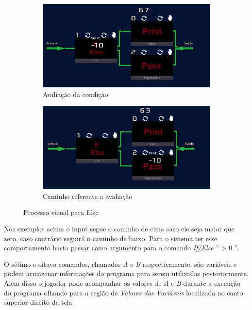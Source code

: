 \begin{figure}[H]
    \centering
    \begin{subfigure}{0.48\textwidth}
        \centering
        \includegraphics[width=1\textwidth]{../figuras/avaliacao_else.png}
        \caption{Avaliação da condição}
    \end{subfigure}
    \begin{subfigure}{0.48\textwidth}
        \centering
        \includegraphics[width=1\textwidth]{../figuras/caminho_else.png}
        \caption{Caminho referente a avaliação}
    \end{subfigure}  
    \caption{Processo visual para Else}
\end{figure}

Nos exemplos acima o input segue o caminho de cima caso ele seja maior que zero,
caso contrário seguirá o caminho de baixo. Para o sistema ter esse comportamento
basta passar como argumento para o comando \textit{If/Else} '' > 0 ''.

O sétimo e oitavo comandos, chamados \textit{A} e \textit{B} respectivamente, 
são variáveis e podem armazenar informações do programa para serem utilizadas
posteriormente. Além disso o jogador pode acompanhar os valores de \textit{A} e
\textit{B} durante a execução do programa olhando para a região de 
\textit{Valores das Variáveis} localizada no canto superior direito da tela.



